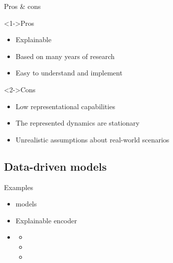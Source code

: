 \begin{frame}{Pros \& cons}
    \begin{exampleblock}<1->{Pros}
    \begin{itemize}
        \item Explainable
        \item Based on many years of research
        \item Easy to understand and implement
    \end{itemize}
    \end{exampleblock}

    \begin{alertblock}<2->{Cons}
    \begin{itemize}
        \item Low representational capabilities
        \item The represented dynamics are stationary
        \item Unrealistic assumptions about real-world scenarios
    \end{itemize}
    \end{alertblock}
\end{frame}

\subsection{Data-driven models}

\begin{frame}{Examples}
    \begin{itemize}
        \item<1->  models \cite{ceylanEstimationCOVID19Prevalence2020,singhPredictionCOVID19Pandemic2020,ribeiroShorttermForecastingCOVID192020}
        \item<2-> Explainable  encoder \cite{ramchandaniDeepCOVIDNetInterpretableDeep2020}
        \item<3->  \cite{chimmulaTimeSeriesForecasting2020,shahidPredictionsCOVID19Deep2020}
        \begin{itemize}
            \item {}
            \item {}
            \item {}
        \end{itemize}
    \end{itemize}
\end{frame}

